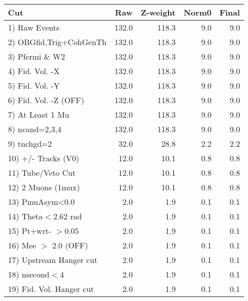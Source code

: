  \begin{table}[h!]\centering
 \begin{tabular}{||l||r|r|r|r||}
 \hline
 \hline
 Cut & Raw & Z-weight & Norm0 & Final \\
 \hline
  1) Raw Events           &       132.0 &       118.3 &         9.0 &         9.0 \\
  2) OBGfid,Trig+CohGenTh &       132.0 &       118.3 &         9.0 &         9.0 \\
  3) Pfermi \& W2         &       132.0 &       118.3 &         9.0 &         9.0 \\
  4) Fid. Vol. -X         &       132.0 &       118.3 &         9.0 &         9.0 \\
  5) Fid. Vol. -Y         &       132.0 &       118.3 &         9.0 &         9.0 \\
  6) Fid. Vol. -Z (OFF)   &       132.0 &       118.3 &         9.0 &         9.0 \\
  7) At Least 1 Mu        &       132.0 &       118.3 &         9.0 &         9.0 \\
  8) ncand=2,3,4          &       132.0 &       118.3 &         9.0 &         9.0 \\
  9) tnchgd=2             &        32.0 &        28.8 &         2.2 &         2.2 \\
 10) +/- Tracks (V0)      &        12.0 &        10.1 &         0.8 &         0.8 \\
 11) Tube/Veto Cut        &        12.0 &        10.1 &         0.8 &         0.8 \\
 12) 2 Muons (1mux)       &        12.0 &        10.1 &         0.8 &         0.8 \\
 13) PmuAsym<0.0          &         2.0 &         1.9 &         0.1 &         0.1 \\
 14) Theta$<$2.62 rad     &         2.0 &         1.9 &         0.1 &         0.1 \\
 15) Pt+wrt- $>$0.05      &         2.0 &         1.9 &         0.1 &         0.1 \\
 16) Mee $>$ 2.0  (OFF)   &         2.0 &         1.9 &         0.1 &         0.1 \\
 17) Upstream Hanger cut  &         2.0 &         1.9 &         0.1 &         0.1 \\
 18) nsecond$<$4          &         2.0 &         1.9 &         0.1 &         0.1 \\
 19) Fid. Vol. Hanger cut &         2.0 &         1.9 &         0.1 &         0.1 \\

\end{tabular}
\end{table}
